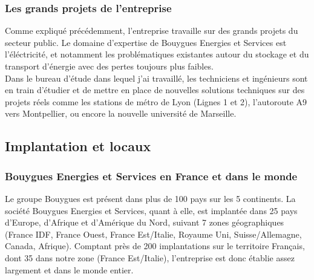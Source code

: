 \documentclass[a4paper]{article}
\begin{document}
    \subsubsection{Les grands projets de l'entreprise}

    Comme expliqué précédemment, l'entreprise travaille sur des grands projets du secteur public. Le domaine d'expertise de Bouygues Energies et Services est l'éléctricité, et notamment les problématiques existantes autour du stockage et du transport d'énergie avec des pertes toujours plus faibles. \\

    Dans le bureau d'étude dans lequel j'ai travaillé, les techniciens et ingénieurs sont en train d'étudier et de mettre en place de nouvelles solutions techniques sur des projets réels comme les stations de métro de Lyon (Lignes 1 et 2), l’autoroute A9 vers Montpellier, ou encore la nouvelle université de Marseille. \\

    \subsection{Implantation et locaux}
    \subsubsection{Bouygues Energies et Services en France et dans le monde}

    Le groupe Bouygues est présent dans plus de 100 pays sur les 5 continents. La société Bouygues Energies et Services, quant à elle, est implantée dans 25 pays d’Europe, d’Afrique et d’Amérique du Nord, suivant 7 zones géographiques (France IDF, France Ouest, France Est/Italie, Royaume Uni, Suisse/Allemagne, Canada, Afrique). Comptant près de 200 implantations sur le territoire Français, dont 35 dans notre zone (France Est/Italie), l’entreprise est donc établie assez largement et dans le monde entier. \\
\end{document}
